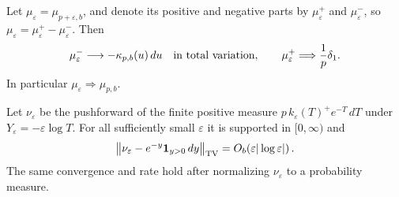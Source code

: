 \begin{theorem}
\label{real:thm:boundary-mass}
Let $\mu_\varepsilon=\mu_{p+\varepsilon,b}$, and denote its positive
and negative parts by $\mu_\varepsilon^+$ and
$\mu_\varepsilon^-$, so $\mu_\varepsilon=
\mu_\varepsilon^+-\mu_\varepsilon^-$. Then
\begin{equation}\label{real:eq:boundary-measures}
 \mu_\varepsilon^-\longrightarrow
       -\kappa_{p,b}(u)\,du\quad\hbox{in total variation},\qquad
 \mu_\varepsilon^+\Longrightarrow\frac1p\delta_1.
\end{equation}
In particular $\mu_\varepsilon\Longrightarrow\mu_{p,b}$.

Let $\nu_\varepsilon$ be the pushforward of the finite positive
measure $p\,k_\varepsilon(T)^+e^{-T}\,dT$ under
$Y_\varepsilon=-\varepsilon\log T$. For all sufficiently small
$\varepsilon$ it is supported in $[0,\infty)$ and
\begin{equation}\label{real:eq:exponential-law}
 \left\|\nu_\varepsilon-e^{-y}\mathbf1_{y>0}\,dy
       \right\|_{\rm TV}
 =O_b\!\left(\varepsilon|\log\varepsilon|\right).
\end{equation}
The same convergence and rate hold after normalizing
$\nu_\varepsilon$ to a probability measure.
\end{theorem}

